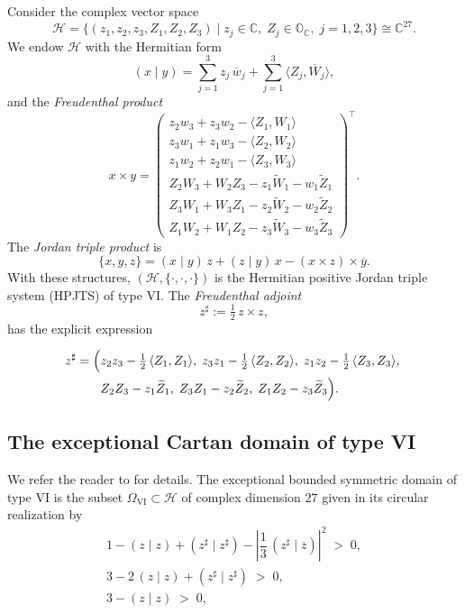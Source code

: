 \documentclass[reqno, 11pt]{amsart}
\newcommand{\ov}[1]{\overline{#1}}
\begin{document}
Consider the complex vector space
\begin{equation}\label{HZ123}
\mathcal H=\bigl\{(z_1,z_2,z_3,Z_1,Z_2,Z_3)\mid z_j\in\mathbb C,\; Z_j\in\mathbb{O}_{\mathbb C},\;j=1,2,3\bigr\}\cong\mathbb C^{27}.
\end{equation}
We endow $\mathcal H$ with the Hermitian form
\[
(x\mid y)=\sum_{j=1}^{3} z_j\,\overline{w}_j+\sum_{j=1}^{3}\langle Z_j,\overline{W}_j\rangle,
\]
and the \emph{Freudenthal product}
\[
x\times y
=
\begin{pmatrix}
z_2w_3+z_3w_2-\langle Z_1,W_1\rangle\\[3pt]
z_3w_1+z_1w_3-\langle Z_2,W_2\rangle\\[3pt]
z_1w_2+z_2w_1-\langle Z_3,W_3\rangle\\[3pt]
Z_2W_3+W_2Z_3 - z_1\widetilde W_1 - w_1\widetilde Z_1\\[3pt]
Z_3W_1+W_3Z_1 - z_2\widetilde W_2 - w_2\widetilde Z_2\\[3pt]
Z_1W_2+W_1Z_2 - z_3\widetilde W_3 - w_3\widetilde Z_3
\end{pmatrix}^{\!\top}.
\]
The \emph{Jordan triple product} is
\begin{equation}\label{EQtriplPrVI}
\{x,y,z\}=(x\mid y)\,z+(z\mid y)\,x-(x\times z)\times\overline y.
\end{equation}
With these structures, $(\mathcal H,\{\cdot,\cdot,\cdot\})$ is the Hermitian positive Jordan triple system (HPJTS) of type VI. The {\em Freudenthal adjoint}
\[
z^{\sharp}:=\tfrac12\,z\times z,
\]
has the explicit expression


\begin{equation}\label{EQadjVI}\begin{split} 
z^{\sharp}=\Bigl(&
z_2 z_3 - \tfrac{1}{2}\,\langle Z_1,Z_1\rangle,\;
z_3 z_1 - \tfrac{1}{2}\,\langle Z_2,Z_2\rangle,\;
z_1 z_2 - \tfrac{1}{2}\,\langle Z_3,Z_3\rangle,\;\\
&Z_2 Z_3 - z_1 \widetilde{Z}_1,\;
Z_3 Z_1 - z_2 \widetilde{Z}_2,\;
Z_1 Z_2 - z_3 \widetilde{Z}_3
\Bigr). 
\end{split}\end{equation}


\subsection{The exceptional Cartan domain of type VI}
We refer the reader to \cite{RoosBook2000Exceptional, VivianiBook2014HSS} for details.
The exceptional bounded symmetric domain of type VI is the subset $\Omega_{\mathrm{VI}}\subset\mathcal H$ of complex dimension $27$ given in its circular realization by
\begin{equation}\label{EQeqVI}
\begin{gathered}
1-(z \mid  z)+(z^{\sharp}  \mid  {z^{\sharp}})-\left|\dfrac{1}{3}\,(z^{\sharp}\mid\ov z)\right|^2\;>\;0,\\[4pt]
3-2\,(z \mid z)+(z^{\sharp}\mid{z^{\sharp}})\;>\;0,\\[2pt]
3-(z \mid z)\;>\;0,
\end{gathered}
\end{equation}
\end{document}
